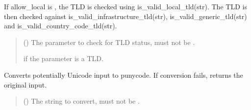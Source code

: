 \documentclass[letterpaper,10pt,english]{sphinxmanual}
\begin{document}
\begin{fulllineitems}
\begin{fulllineitems}
\sphinxAtStartPar
If allow\_local is , the TLD is checked using is\_valid\_local\_tld(str). The
TLD is then checked against is\_valid\_infrastructure\_tld(str),
is\_valid\_generic\_tld(str) and is\_valid\_country\_code\_tld(str).
\begin{quote}\begin{description}
\sphinxAtStartPar
{} () \textendash{} The parameter to check for TLD status, must not be .

\sphinxAtStartPar
{} if the parameter is a TLD.

\end{description}\end{quote}

\end{fulllineitems}


\begin{fulllineitems}
\label{\detokenize{apache_commons_validator_python.routines:apache_commons_validator_python.routines.domain_validator.DomainValidator.serializable}}
\pysigstartsignatures
{}
\pysigstopsignatures
\end{fulllineitems}


\begin{fulllineitems}
\label{\detokenize{apache_commons_validator_python.routines:apache_commons_validator_python.routines.domain_validator.DomainValidator.unicode_to_ascii}}
\pysigstartsignatures
{}
\pysigstopsignatures
\sphinxAtStartPar
Converts potentially Unicode input to punycode. If conversion fails, returns
the original input.
\begin{quote}\begin{description}
\sphinxAtStartPar
{} () \textendash{} The string to convert, must not be .


\end{description}
\end{quote}
\end{fulllineitems}
\end{fulllineitems}
\end{document}
